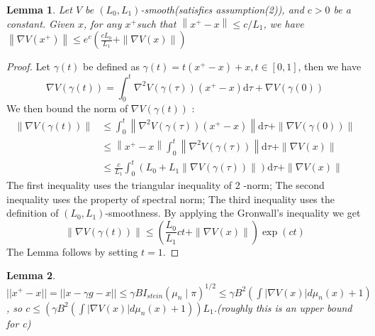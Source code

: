 \documentclass[12pt,a4paper]{article}
\newtheorem*{lemma}{Lemma}
\begin{document}
\begin{lemma}
	Let $V$ be $\left(L_{0}, L_{1}\right)$-smooth(satisfies assumption(2)), and $c>0$ be a constant. Given $x$, for any $x^{+}$such that $\left\|x^{+}-x\right\| \leq c / L_{1}$, we have $\left\|\nabla V\left(x^{+}\right)\right\| \leq e^{c}\left(\frac{c L_{0}}{L_{1}}+\|\nabla V(x)\|\right)$
\end{lemma} 
\begin{proof} Let $\gamma(t)$ be defined as $\gamma(t)=t\left(x^{+}-x\right)+x, t \in[0,1]$, then we have
$$
\nabla V(\gamma(t))=\int_{0}^{t} \nabla^{2} V(\gamma(\tau))\left(x^{+}-x\right) \mathrm{d} \tau+\nabla V(\gamma(0))
$$
We then bound the norm of $\nabla V(\gamma(t))$ :
$$
\begin{aligned}
	\|\nabla V(\gamma(t))\| & \leq \int_{0}^{t}\left\|\nabla^{2} V(\gamma(\tau))\left(x^{+}-x\right)\right\| \mathrm{d} \tau+\|\nabla V(\gamma(0))\| \\
	& \leq\left\|x^{+}-x\right\| \int_{0}^{t}\left\|\nabla^{2} V(\gamma(\tau))\right\| \mathrm{d} \tau+\|\nabla V(x)\| \\
	& \leq \frac{c}{L_{1}} \int_{0}^{t}\left(L_{0}+L_{1}\|\nabla V(\gamma(\tau))\|\right) \mathrm{d} \tau+\|\nabla V(x)\|
\end{aligned}
$$
The first inequality uses the triangular inequality of 2 -norm; The second inequality uses the property of spectral norm; The third inequality uses the definition of $\left(L_{0}, L_{1}\right)$-smoothness. By applying the Gronwall's inequality we get
$$
\|\nabla V(\gamma(t))\| \leq\left(\frac{L_{0}}{L_{1}} c t+\|\nabla V(x)\|\right) \exp (c t)
$$
The Lemma follows by setting $t=1$.
\end{proof}
\begin{lemma}
	$||x^{+}-x||=||x-\gamma g -x||\leq \gamma B I_{stein}(\mu_n\mid \pi)^{1/2}\leq \gamma B^2(\int |\nabla V(x)|d\mu_n(x)+1)$, so $c\leq (\gamma B^2(\int |\nabla V(x)|d\mu_n(x)+1))L_1$.(roughly this is an upper bound for c)
\end{lemma}
\end{document}
